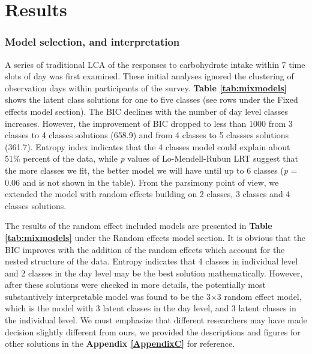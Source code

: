 
\chapter{Results} %

\label{Chapter 3} %


\vspace{-0.7cm}


\subsection{Model selection, and interpretation}\vspace{-0.4cm}

A series of traditional LCA of the responses to carbohydrate intake within 7 time slots of day was first examined. These initial analyses ignored the clustering of observation days within participants of the survey. \textbf{Table \ref{tab:mixmodels}} shows the latent class solutions for one to five classes (see rows under the Fixed effects model section). The BIC declines with the number of day level classes increases. However, the improvement of BIC dropped to less than 1000 from 3 classes to 4 classes solutions (658.9) and from 4 classes to 5 classses solutions (361.7). Entropy index indicates that the 4 classes model could explain about 51\% percent of the data, while \textit{p} values of Lo-Mendell-Rubun LRT suggest that the more classes we fit, the better model we will have until up to 6 classes (\textit{p} = 0.06 and is not shown in the table). From the parsimony point of view, we extended the model with random effects building on 2 classes, 3 classes and 4 classes solutions. 

The results of the random effect included models are presented in \textbf{Table \ref{tab:mixmodels}} under the Random effects model section. It is obvious that the BIC improves with the addition of the random effects which account for the nested structure of the data. Entropy indicates that 4 classes in individual level and 2 classes in the day level may be the best solution mathematically. However, after these solutions were checked in more details, the potentially most substantively interpretable model was found to be the 3$\times$3 random effect model, which is the model with 3 latent classes in the day level, and 3 latent classes in the individual level. We must emphasize that different researchers may have made decision slightly different from ours, we provided the descriptions and figures for other solutions in the \textbf{Appendix \ref{AppendixC}} for reference. 

